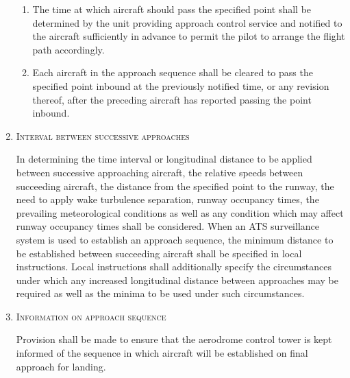 \documentclass[../vATM.tex]{subfiles}
\begin{document}
\begin{enumeratesc}
\begin{enumerate}[labelindent=0pt,itemsep=0.2cm]
\begin{enumerate}
                \item The time at which aircraft should pass the specified point shall be determined by the unit providing approach control service and notified to the aircraft sufficiently in advance to permit the pilot to arrange the flight path accordingly.
                \item Each aircraft in the approach sequence shall be cleared to pass the specified point inbound at the previously notified time, or any revision thereof, after the preceding aircraft has reported passing the point inbound.
            \end{enumerate}

            \item \textsc{Interval between successive approaches}

            \noindent In determining the time interval or longitudinal distance to be applied between successive approaching aircraft, the relative speeds between succeeding aircraft, the distance from the specified point to the runway, the need to apply wake turbulence separation, runway occupancy times, the prevailing meteorological conditions as well as any condition which may affect runway occupancy times shall be considered. When an ATS surveillance system is used to establish an approach sequence, the minimum distance to be established between succeeding aircraft shall be specified in local instructions. Local instructions shall additionally specify the circumstances under which any increased longitudinal distance between approaches may be required as well as the minima to be used under such circumstances.

            \item \textsc{Information on approach sequence}

            \noindent Provision shall be made to ensure that the aerodrome control tower is kept informed of the sequence in which aircraft will be established on final approach for landing.
        \end{enumerate}
    \end{enumeratesc}
\end{document}
